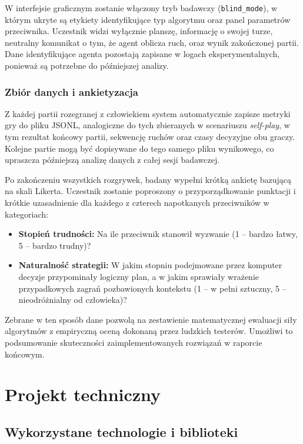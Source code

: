 \documentclass{article}
\begin{document}
W interfejsie graficznym zostanie włączony tryb badawczy (\texttt{blind\_mode}), w którym ukryte są etykiety identyfikujące typ algorytmu oraz panel parametrów przeciwnika. Uczestnik widzi wyłącznie planszę, informację o swojej turze, neutralny komunikat o tym, że agent oblicza ruch, oraz wynik zakończonej partii. Dane identyfikujące agenta pozostają zapisane w logach eksperymentalnych, ponieważ są potrzebne do późniejszej analizy.

\subsubsection{Zbiór danych i ankietyzacja}
Z każdej partii rozegranej z człowiekiem system automatycznie zapisze metryki gry do pliku JSONL, analogiczne do tych zbieranych w scenariuszu \textit{self-play}, w tym rezultat końcowy partii, sekwencję ruchów oraz czasy decyzyjne obu graczy. Kolejne partie mogą być dopisywane do tego samego pliku wynikowego, co upraszcza późniejszą analizę danych z całej sesji badawczej.

Po zakończeniu wszystkich rozgrywek, badany wypełni krótką ankietę bazującą na skali Likerta. Uczestnik zostanie poproszony o przyporządkowanie punktacji i krótkie uzasadnienie dla każdego z czterech napotkanych przeciwników w kategoriach:
\begin{itemize}
    \item \textbf{Stopień trudności:} Na ile przeciwnik stanowił wyzwanie (1 -- bardzo łatwy, 5 -- bardzo trudny)?
    \item \textbf{Naturalność strategii:} W jakim stopniu podejmowane przez komputer decyzje przypominały logiczny plan, a w jakim sprawiały wrażenie przypadkowych zagrań pozbawionych kontekstu (1 -- w pełni sztuczny, 5 -- nieodróżnialny od człowieka)?
\end{itemize}

Zebrane w ten sposób dane pozwolą na zestawienie matematycznej ewaluacji siły algorytmów z empiryczną oceną dokonaną przez ludzkich testerów. Umożliwi to podsumowanie skuteczności zaimplementowanych rozwiązań w raporcie końcowym.

\newpage

\section{Projekt techniczny}

\subsection{Wykorzystane technologie i biblioteki}
\label{ssec:wykorzystane_technologie}
\end{document}
